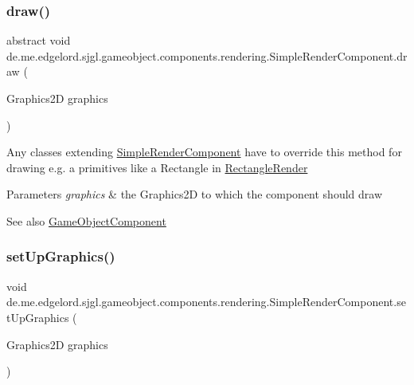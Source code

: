 \subsubsection{\texorpdfstring{draw()}{draw()}}
{\footnotesize\ttfamily abstract void de.\+me.\+edgelord.\+sjgl.\+gameobject.\+components.\+rendering.\+Simple\+Render\+Component.\+draw (\begin{DoxyParamCaption}\item[{Graphics2D}]{graphics }\end{DoxyParamCaption})\hspace{0.3cm}{\ttfamily [abstract]}}

Any classes extending \mbox{\hyperlink{classde_1_1me_1_1edgelord_1_1sjgl_1_1gameobject_1_1components_1_1rendering_1_1_simple_render_component}{Simple\+Render\+Component}} have to override this method for drawing e.\+g. a primitives like a Rectangle in \mbox{\hyperlink{classde_1_1me_1_1edgelord_1_1sjgl_1_1gameobject_1_1components_1_1rendering_1_1_rectangle_render}{Rectangle\+Render}} 
\begin{DoxyParams}{Parameters}
{\em graphics} & the Graphics2D to which the component should draw\\
\hline
\end{DoxyParams}
\begin{DoxySeeAlso}{See also}
\mbox{\hyperlink{classde_1_1me_1_1edgelord_1_1sjgl_1_1gameobject_1_1_game_object_component}{Game\+Object\+Component}} 
\end{DoxySeeAlso}
\mbox{\label{classde_1_1me_1_1edgelord_1_1sjgl_1_1gameobject_1_1components_1_1rendering_1_1_simple_render_component_a33ef64cd384ed8a5e224cdf628d212b1}} 
\subsubsection{\texorpdfstring{set\+Up\+Graphics()}{setUpGraphics()}}
{\footnotesize\ttfamily void de.\+me.\+edgelord.\+sjgl.\+gameobject.\+components.\+rendering.\+Simple\+Render\+Component.\+set\+Up\+Graphics (\begin{DoxyParamCaption}\item[{Graphics2D}]{graphics }\end{DoxyParamCaption})\hspace{0.3cm}{\ttfamily [protected]}}

